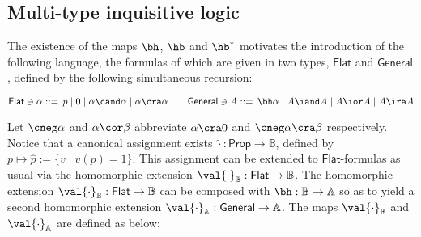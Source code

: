 \subsection{Multi-type inquisitive logic}
\label{ssec:multi-type Inql}
The existence of the maps $\bh$, $\hb$ and $\hb^*$ motivates the introduction of the following language, the formulas of which are given in two types, $\mathsf{Flat}$ and $\mathsf{General}$, defined by the following simultaneous recursion:
\begin{center}
$\mathsf{Flat}\ni \alpha ::= \,p \mid 0 \mid \alpha \cand \alpha \mid \alpha \cra \alpha \quad \quad \mathsf{General}\ni  A ::= \,\bh \alpha \mid A \iand A \mid A \ior A \mid A \ira A$
\end{center}

Let $\cneg\alpha$ and $\alpha\cor\beta$ abbreviate $\alpha\cra 0$ and  $\cneg\alpha\cra\beta$ respectively.
Notice that a canonical assignment exists $\hat{\cdot}:\mathsf{Prop}\rightarrow \mathbb{B}$, defined by $p\mapsto \hat{p} := \{v\mid v(p) = 1\}$. This assignment can be extended to $\mathsf{Flat}$-formulas as usual via the homomorphic extension $\val{\cdot}_\mathbb{B}: \mathsf{Flat}\to \mathbb{B}$.
The homomorphic extension $\val{\cdot}_\mathbb{B}: \mathsf{Flat}\to \mathbb{B}$ can be composed with $\bh: \mathbb{B}\to \mathbb{A}$ so as to yield a second homomorphic extension $\val{\cdot}_\mathbb{A}: \mathsf{General}\to \mathbb{A}$.
The maps $\val{\cdot}_\mathbb{B}$ and
$\val{\cdot}_\mathbb{A}$ are defined as below:


